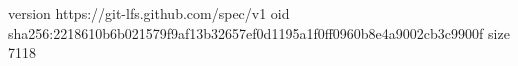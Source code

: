 version https://git-lfs.github.com/spec/v1
oid sha256:2218610b6b021579f9af13b32657ef0d1195a1f0ff0960b8e4a9002cb3c9900f
size 7118
